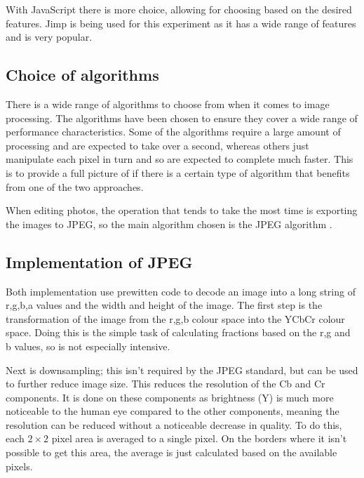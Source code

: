 \documentclass[12pt,a4paper]{article}
\begin{document}
With JavaScript there is more choice, allowing for choosing based on the desired features. Jimp is being used for this experiment as it has a wide range of features and is very popular.




\subsection{Choice of algorithms}

There is a wide range of algorithms to choose from when it comes to image processing. The algorithms have been chosen to ensure they cover a wide range of performance characteristics. Some of the algorithms require a large amount of processing and are expected to take over a second, whereas others just manipulate each pixel in turn and so are expected to complete much faster. This is to provide a full picture of if there is a certain type of algorithm that benefits from one of the two approaches.

When editing photos, the operation that tends to take the most time is exporting the images to JPEG, so the main algorithm chosen is the JPEG algorithm \cite{jpeg}.

\subsection{Implementation of JPEG}


Both implementation use prewitten code to decode an image into a long string of r,g,b,a values and the width and height of the image. The first step is the transformation of the image from the r,g,b colour space into the YCbCr colour space. Doing this is the simple task of calculating fractions based on the r,g and b values, so is not especially intensive.

Next is downsampling; this isn't required by the JPEG standard, but can be used to further reduce image size. This reduces the resolution of the Cb and Cr components. It is done on these components as brightness (Y) is much more noticeable to the human eye compared to the other components, meaning the resolution can be reduced without a noticeable decrease in quality. To do this, each $2\times 2$ pixel area is averaged to a single pixel. On the borders where it isn't possible to get this area, the average is just calculated based on the available pixels.
\end{document}
